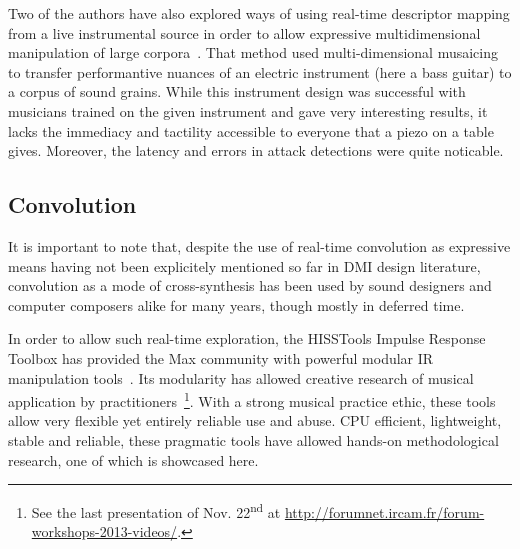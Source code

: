 \label{sandbox}
Two of the authors have also explored ways of using real-time descriptor mapping from a live instrumental source in order to allow expressive multidimensional manipulation of large corpora~\cite{TremblaySchwarz-nime2010-surfing-the-waves}. That method used multi-dimensional musaicing to transfer performantive nuances of an electric instrument (here a bass guitar) to a corpus of sound grains. While this instrument design was successful with musicians trained on the given instrument and gave very interesting results, it lacks the immediacy and tactility accessible to everyone that a piezo on a table gives. Moreover, the latency and errors in attack detections were quite noticable.


\subsection{Convolution}

It is important to note that, despite the use of real-time convolution as expressive means having not been explicitely mentioned so far in DMI design literature, convolution as a mode of cross-synthesis has been used by sound designers and computer composers alike for many years, though mostly in deferred time.

In order to allow such real-time exploration, the HISSTools Impulse Response Toolbox has provided the Max community with powerful modular IR manipulation tools~\cite{HarkerTremblay-icmc2012-hisstools}. Its modularity has allowed creative research of musical application by practitioners~\cite{HarkerTremblay-forum2013-rethinking-the-box}\footnote{See  the last presentation of Nov. 22\textsuperscript{nd} at \url{http://forumnet.ircam.fr/forum-workshops-2013-videos/}.}. With a strong musical practice ethic, these tools allow very flexible yet entirely reliable use and abuse. CPU efficient, lightweight, stable and reliable, these pragmatic tools have allowed hands-on methodological research, one of which is showcased here.


